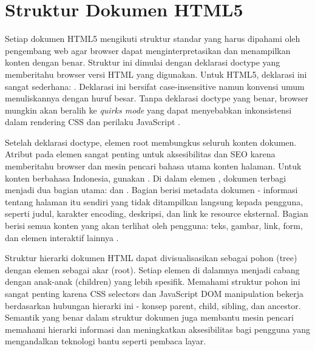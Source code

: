﻿\section{Struktur Dokumen HTML5}

Setiap dokumen HTML5 mengikuti struktur standar yang harus dipahami oleh pengembang web agar browser dapat menginterpretasikan dan menampilkan konten dengan benar. Struktur ini dimulai dengan deklarasi doctype yang memberitahu browser versi HTML yang digunakan. Untuk HTML5, deklarasi ini sangat sederhana: . Deklarasi ini bersifat case-insensitive namun konvensi umum menuliskannya dengan huruf besar. Tanpa deklarasi doctype yang benar, browser mungkin akan beralih ke \textit{quirks mode} yang dapat menyebabkan inkonsistensi dalam rendering CSS dan perilaku JavaScript \cite{whatwgHtml}.

Setelah deklarasi doctype, elemen root  membungkus seluruh konten dokumen. Atribut  pada elemen  sangat penting untuk aksesibilitas dan SEO karena memberitahu browser dan mesin pencari bahasa utama konten halaman. Untuk konten berbahasa Indonesia, gunakan . Di dalam elemen , dokumen terbagi menjadi dua bagian utama:  dan . Bagian  berisi metadata dokumen - informasi tentang halaman itu sendiri yang tidak ditampilkan langsung kepada pengguna, seperti judul, karakter encoding, deskripsi, dan link ke resource eksternal. Bagian  berisi semua konten yang akan terlihat oleh pengguna: teks, gambar, link, form, dan elemen interaktif lainnya \cite{mdnHtmlIntro}.

Struktur hierarki dokumen HTML dapat divisualisasikan sebagai pohon (tree) dengan elemen  sebagai akar (root). Setiap elemen di dalamnya menjadi cabang dengan anak-anak (children) yang lebih spesifik. Memahami struktur pohon ini sangat penting karena CSS selectors dan JavaScript DOM manipulation bekerja berdasarkan hubungan hierarki ini - konsep parent, child, sibling, dan ancestor. Semantik yang benar dalam struktur dokumen juga membantu mesin pencari memahami hierarki informasi dan meningkatkan aksesibilitas bagi pengguna yang mengandalkan teknologi bantu seperti pembaca layar.

